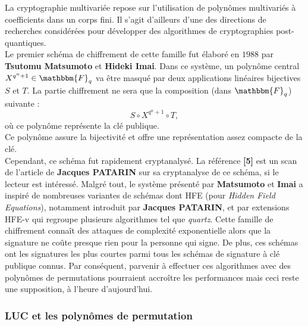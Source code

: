 \documentclass[12pt]{article}
\theoremstyle{remark}\newtheorem{note}{Note}
\theoremstyle{remark}\newtheorem{nota}{Notation}
\newcommand{\Fq}{\mathbbm{F}_q}
\theoremstyle{definition}
\begin{document}
La cryptographie multivariée repose sur l'utilisation de polynômes multivariés à coefficients dans un corps fini. Il s'agit d'ailleurs d'une des directions de recherches considérées pour développer des algorithmes de cryptographies post-quantiques.\\
Le premier schéma de chiffrement de cette famille fut élaboré en $1988$ par \textbf{Tsutomu Matsumoto} et \textbf{Hideki Imai}. Dans ce système, un polynôme central $X^{q^n+1} \in \Fq$ va être masqué par deux applications linéaires bijectives $S$ et $T$. La partie chiffrement ne sera que la composition (dans $\Fq$) suivante : $$S\circ X^{q^n+1} \circ T,$$
où ce polynôme représente la clé publique.\\
Ce polynôme assure la bijectivité et offre une représentation assez compacte de la clé. \vspace{12pt} \\
Cependant, ce schéma fut rapidement cryptanalysé. La référence \textbf{[5]} est un scan de l'article de \textbf{Jacques PATARIN} sur sa cryptanalyse de ce schéma, si le lecteur est intéressé. Malgré tout, le système présenté par \textbf{Matsumoto} et \textbf{Imai} a inspiré de nombreuses variantes de schémas dont \textsf{HFE} (pour \textit{Hidden Field Equations}), notamment introduit par \textbf{Jacques PATARIN}, et par extensions %
\textsf{HFE-v} qui regroupe plusieurs algorithmes tel que \textit{quartz}. Cette famille de chiffrement connaît des attaques de complexité exponentielle alors que la signature ne coûte presque rien pour la personne qui signe. De plus, ces schémas ont les signatures les plus courtes parmi tous les schémas de signature à clé publique connus. Par conséquent, parvenir à effectuer ces algorithmes avec des polynômes de permutations pourraient accroître les performances mais ceci reste une supposition, à l'heure d'aujourd'hui.\\

\subsubsection{LUC et les polynômes de permutation}
\end{document}
